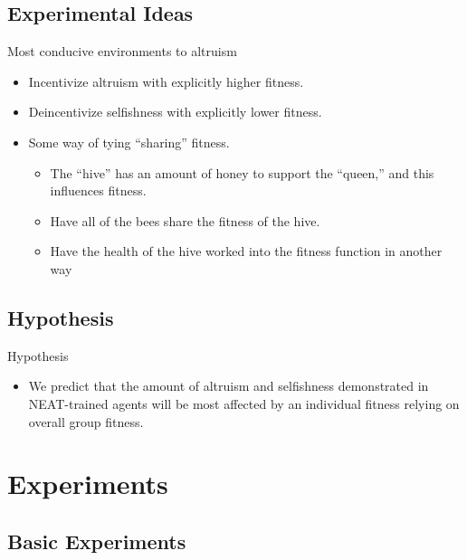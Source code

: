 \documentclass{beamer}
\begin{document}
    \subsection{Experimental Ideas}
    \begin{frame}{Most conducive environments to altruism}
        \begin{itemize}
            \item Incentivize altruism with explicitly higher fitness.
            \item Deincentivize selfishness with explicitly lower fitness.

            \item Some way of tying ``sharing'' fitness.
            \begin{itemize}
                \item The ``hive'' has an amount of honey to support the ``queen,'' and this 
                      influences fitness.
                \item Have all of the bees share the fitness of the hive.
                \item Have the health of the hive worked into the fitness function in another way
            \end{itemize}
        \end{itemize}
    \end{frame}


    \subsection{Hypothesis}
    \begin{frame}{Hypothesis}
        \begin{itemize}
                \item We predict that the amount of altruism and selfishness demonstrated in 
                      NEAT-trained agents will be most affected by an individual fitness relying
                      on overall group fitness.

        \end{itemize}
    \end{frame}

    \section{Experiments}

    \subsection{Basic Experiments}
\end{document}
